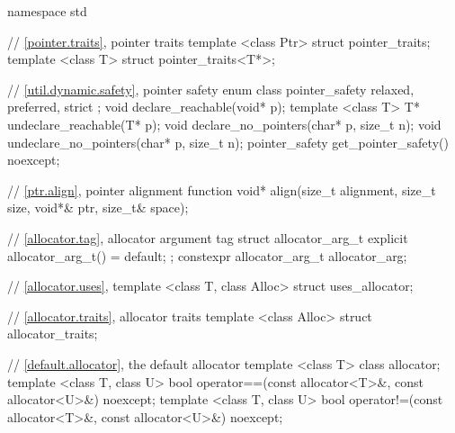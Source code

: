 %
%
\begin{codeblock}
namespace std {
  // \ref{pointer.traits}, pointer traits
  template <class Ptr> struct pointer_traits;
  template <class T> struct pointer_traits<T*>;

  // \ref{util.dynamic.safety}, pointer safety
  enum class pointer_safety { relaxed, preferred, strict };
  void declare_reachable(void* p);
  template <class T> T* undeclare_reachable(T* p);
  void declare_no_pointers(char* p, size_t n);
  void undeclare_no_pointers(char* p, size_t n);
  pointer_safety get_pointer_safety() noexcept;

  // \ref{ptr.align}, pointer alignment function
  void* align(size_t alignment, size_t size, void*& ptr, size_t& space);

  // \ref{allocator.tag}, allocator argument tag
  struct allocator_arg_t { explicit allocator_arg_t() = default; };
  constexpr allocator_arg_t allocator_arg{};

  // \ref{allocator.uses}, 
  template <class T, class Alloc> struct uses_allocator;

  // \ref{allocator.traits}, allocator traits
  template <class Alloc> struct allocator_traits;

  // \ref{default.allocator}, the default allocator
  template <class T> class allocator;
  template <class T, class U>
    bool operator==(const allocator<T>&, const allocator<U>&) noexcept;
  template <class T, class U>
    bool operator!=(const allocator<T>&, const allocator<U>&) noexcept;

}
\end{codeblock}
